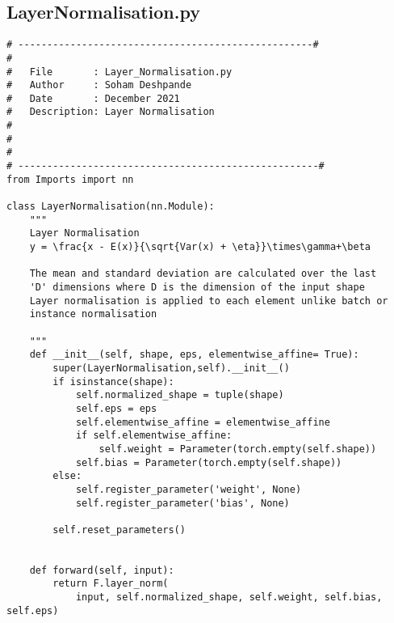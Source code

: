\documentclass{article}
\begin{document}
\subsection{LayerNormalisation.py}
\begin{lstlisting}
# ---------------------------------------------------#
#
#   File       : Layer_Normalisation.py
#   Author     : Soham Deshpande
#   Date       : December 2021
#   Description: Layer Normalisation
#
#
#
# ----------------------------------------------------#
from Imports import nn

class LayerNormalisation(nn.Module):
    """
    Layer Normalisation
    y = \frac{x - E(x)}{\sqrt{Var(x) + \eta}}\times\gamma+\beta

    The mean and standard deviation are calculated over the last
    'D' dimensions where D is the dimension of the input shape
    Layer normalisation is applied to each element unlike batch or
    instance normalisation

    """
    def __init__(self, shape, eps, elementwise_affine= True):
        super(LayerNormalisation,self).__init__()
        if isinstance(shape):
            self.normalized_shape = tuple(shape)
            self.eps = eps
            self.elementwise_affine = elementwise_affine
            if self.elementwise_affine:
                self.weight = Parameter(torch.empty(self.shape))
            self.bias = Parameter(torch.empty(self.shape))
        else:
            self.register_parameter('weight', None)
            self.register_parameter('bias', None)

        self.reset_parameters()


    def forward(self, input):
        return F.layer_norm(
            input, self.normalized_shape, self.weight, self.bias, self.eps)



\end{lstlisting}

\clearpage
\end{document}
